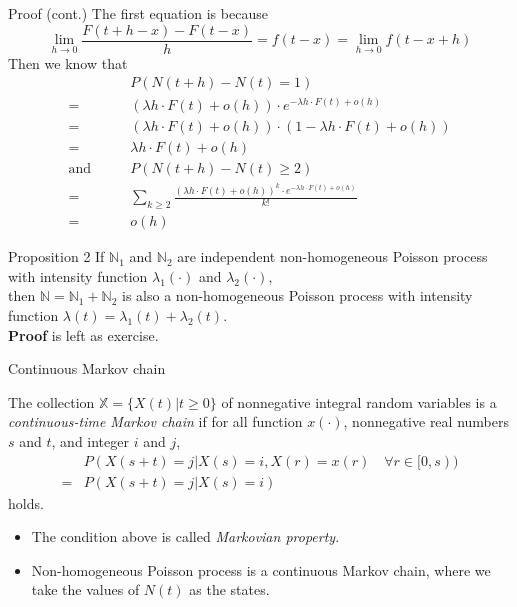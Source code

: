 \documentclass[mathserif]{beamer}
\begin{document}
\begin{frame}{Proof (cont.)}
The first equation is because
\[
\lim_{h\to 0}\frac{F(t+h-x)-F(t-x)}{h} = f(t-x) = \lim_{h\to 0}f(t-x+h)
\]
Then we know that
\begin{align*}
& P(N(t+h)-N(t) = 1) \\
= & (\lambda h\cdot F(t) + o(h))\cdot e^{-\lambda h\cdot F(t) + o(h)} \\
= & (\lambda h\cdot F(t) + o(h))\cdot (1 - \lambda h\cdot F(t) + o(h)) \\
= & \lambda h\cdot F(t) + o(h) \\
\text{and}\qquad & P(N(t+h)-N(t)\geq 2) \\
= & \sum_{k\geq 2}\frac{(\lambda h\cdot F(t) + o(h))^k \cdot e^{-\lambda h\cdot F(t) + o(h)}}{k!} \\
= & o(h)
\end{align*}
\end{frame}

\begin{frame}{Proposition 2}
If $\mathbb{N}_1$ and $\mathbb{N}_2$ are independent non-homogeneous Poisson process with intensity function $\lambda_1(\cdot)$ and $\lambda_2(\cdot)$, \\
then $\mathbb{N} = \mathbb{N}_1 + \mathbb{N}_2$ is also a non-homogeneous Poisson process with intensity function $\lambda(t) = \lambda_1(t) + \lambda_2(t)$.\\
\vspace{\baselineskip}
\textbf{Proof} is left as exercise.
\end{frame}

\begin{frame}{Continuous Markov chain}
\begin{definition}
The collection $\mathbb{X} = \{X(t) | t\geq 0\}$ of nonnegative integral random variables is a \emph{continuous-time Markov chain} if for all function $x(\cdot)$, nonnegative real numbers $s$ and $t$, and integer $i$ and $j$,
\begin{align*}
& P(X(s+t) = j | X(s) = i, X(r) = x(r) \quad\forall r \in [0,s)) \\
= & P(X(s+t) = j | X(s) = i)
\end{align*}
holds.
\end{definition}
\begin{itemize}
\item The condition above is called \emph{Markovian property}.
\item Non-homogeneous Poisson process is a continuous Markov chain, where we take the values of $N(t)$ as the states.
\end{itemize}
\end{frame}
\end{document}
